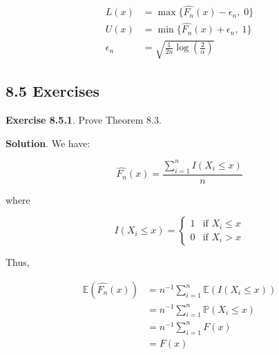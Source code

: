\begin{align}
L(x) &= \max \{ \hat{F_n}(x) - \epsilon_n, \; 0 \} \\
U(x) &= \min \{ \hat{F_n}(x) + \epsilon_n, \; 1 \} \\
\epsilon_n &= \sqrt{\frac{1}{2n} \log \left( \frac{2}{\alpha} \right) }
\end{align}

\subsection{8.5 Exercises}\label{exercises}

\textbf{Exercise 8.5.1}. Prove Theorem 8.3.

\textbf{Solution}. We have:

\[
\hat{F_n}(x) = \frac{\sum_{i=1}^n I\left(X_i \leq x \right)}{n}
\]

where

\[
\begin{equation}
I\left(X_i \leq x\right) =
    \begin{cases}
      1   & \text{if } X_i \leq x \\
      0   & \text{if } X_i > x
    \end{cases}       
\end{equation}
\]

Thus,

\begin{align}
\mathbb{E}(\hat{F_n}(x)) & = n^{-1} \sum_{i = 1}^n \mathbb{E}(I\left(X_i \leq x \right)) \\
 & = n^{-1} \sum_{i = 1}^n \mathbb{P}\left(X_i \leq x \right) \\
 & = n^{-1} \sum_{i = 1}^n F(x) \\
 & = F(x)
\end{align}

